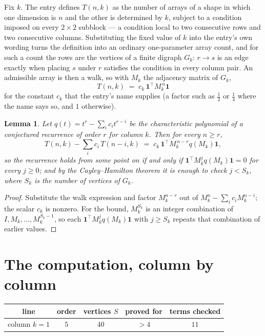\documentclass[11pt,a4paper]{article}
\theoremstyle{plain}
\newtheorem{lemma}[theorem]{Lemma}
\theoremstyle{definition}
\begin{document}
Fix $k$. The entry defines $T(n,k)$ as the number of arrays of a shape in which one dimension
is $n$ and the other is determined by $k$, subject to a condition imposed on every
$2\times2$ subblock --- a condition local to two consecutive rows and two consecutive columns.
Substituting the fixed value of $k$ into the entry's own wording turns the definition into an
ordinary one-parameter array count, and for such a count the rows are the vertices of a finite
digraph $G_k$: $r\to s$ is an edge exactly when placing $s$ under $r$ satisfies the condition
in every column pair. An admissible array is then a walk, so with $M_k$ the adjacency matrix
of $G_k$,
\[
T(n,k)\;=\;c_k\,\mathbf{1}^{\!\top}M_k^{\,n}\mathbf{1}
\]
for the constant $c_k$ that the entry's name supplies (a factor such as $\tfrac12$ or
$\tfrac14$ where the name says so, and $1$ otherwise).

\begin{lemma}\label{lem:crit}
Let $q(t)=t^{r}-\sum_i c_it^{r-i}$ be the characteristic polynomial of a conjectured
recurrence of order $r$ for column $k$. Then for every $n\ge r$,
\[
T(n,k)-\sum_i c_i\,T(n-i,k)\;=\;c_k\,\mathbf{1}^{\!\top}M_k^{\,n-r}q(M_k)\mathbf{1},
\]
so the recurrence holds from some point on if and only if
$\mathbf{1}^{\!\top}M_k^{j}q(M_k)\mathbf{1}=0$ for every $j\ge0$; and by the
Cayley--Hamilton theorem it is enough to check $j<S_k$, where $S_k$ is the number of vertices
of $G_k$.
\end{lemma}

\begin{proof}
Substitute the walk expression and factor $M_k^{n-r}$ out of $M_k^{n}-\sum_ic_iM_k^{n-i}$;
the scalar $c_k$ is nonzero. For the bound, $M_k^{S_k}$ is an integer combination of
$I,M_k,\dots,M_k^{S_k-1}$, so each $\mathbf{1}^{\!\top}M_k^{j}q(M_k)\mathbf{1}$ with
$j\ge S_k$ repeats that combination of earlier values.
\end{proof}

\section{The computation, column by column}

\begin{center}
\begin{tabular}{ccccc}
line & order & vertices $S$ & proved for & terms checked \\ \hline
column $k$$=1$ & $5$ & $40$ & $>4$ & $11$ \\
\end{tabular}
\end{center}
\end{document}
